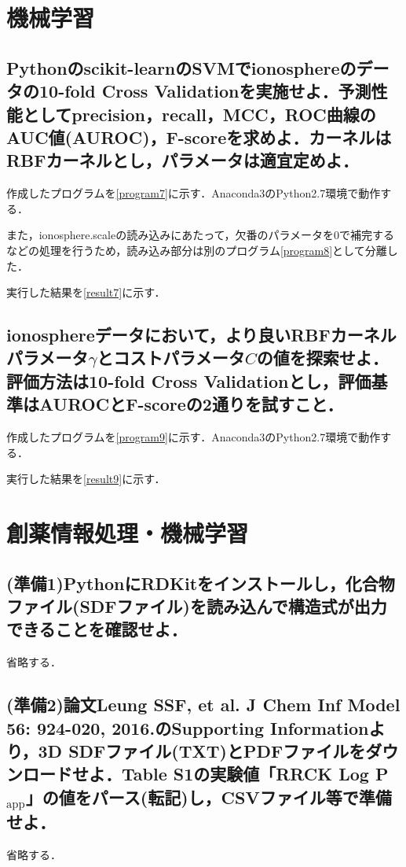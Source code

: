 \documentclass[uplatex,a4j]{jsarticle}
\begin{document}
  \section{機械学習}
  \subsection{Pythonのscikit-learnのSVMでionosphereのデータの10-fold Cross Validationを実施せよ．予測性能としてprecision，recall，MCC，ROC曲線のAUC値(AUROC)，F-scoreを求めよ．カーネルはRBFカーネルとし，パラメータは適宜定めよ．}
  作成したプログラムを\ref{program7}に示す．Anaconda3のPython2.7環境で動作する．
  
  また，ionosphere.scaleの読み込みにあたって，欠番のパラメータを0で補完するなどの処理を行うため，読み込み部分は別のプログラム\ref{program8}として分離した．
  
  実行した結果を\ref{result7}に示す．
  
  
  \subsection{ionosphereデータにおいて，より良いRBFカーネルパラメータ$\gamma$とコストパラメータ$C$の値を探索せよ．評価方法は10-fold Cross Validationとし，評価基準はAUROCとF-scoreの2通りを試すこと．}
  作成したプログラムを\ref{program9}に示す．Anaconda3のPython2.7環境で動作する．
  
  実行した結果を\ref{result9}に示す．
  
  
  \section{創薬情報処理・機械学習}
  \subsection{(準備1)PythonにRDKitをインストールし，化合物ファイル(SDFファイル)を読み込んで構造式が出力できることを確認せよ．}
  省略する．
  
  \subsection{(準備2)論文Leung SSF, et al. J Chem Inf Model 56: 924-020, 2016.のSupporting Informationより，3D SDFファイル(TXT)とPDFファイルをダウンロードせよ．Table S1の実験値「RRCK Log P$_\text{app}$」の値をパース(転記)し，CSVファイル等で準備せよ．}
  省略する．
  
\end{document}
